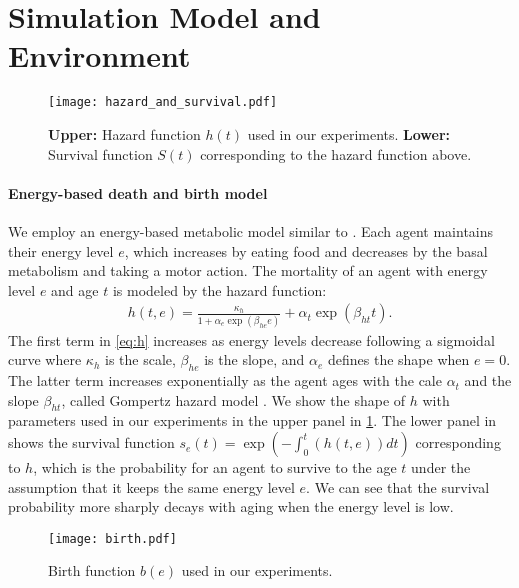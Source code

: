 \section{Simulation Model and Environment}\label{sec:method}

\begin{figure}[t]
  \centering{}
  \texttt{[image: hazard\_and\_survival.pdf]}
  \caption{
    \textbf{Upper:} Hazard function $h(t)$ used in our experiments.
    \textbf{Lower:} Survival function $S(t)$ corresponding to the hazard function above.
  }\label{figure:hs}
\end{figure}

\paragraph{Energy-based death and birth model}
We employ an energy-based metabolic model similar to \citet{hamonEcoevolutionaryDynamicsNonepisodic2023}. Each agent maintains their energy level $e$, which increases by eating food and decreases by the basal metabolism and taking a motor action.
The mortality of an agent with energy level $e$ and age $t$ is modeled by the hazard function:
\begin{align}
  h(t, e) = \frac{\kappa_{h}}{1 + \alpha_{e}\exp(\beta_{he}e)} + \alpha_{t} \exp(\beta_{ht} t).
  \label{eq:h}
\end{align}
The first term in \cref{eq:h} increases as energy levels decrease following a sigmoidal curve where $\kappa_{h}$ is the scale, $\beta_{he}$ is the slope, and $\alpha_{e}$ defines the shape when $e=0$. The latter term increases exponentially as the agent ages with the cale $\alpha_{t}$ and the slope $\beta_{ht}$, called Gompertz hazard model \citep{gompertzXXIVNatureFunction1825,kirkwoodDecipheringDeathCommentary2015}.
We show the shape of $h$ with parameters used in our experiments in the upper panel in \cref{figure:hs}. The lower panel in  shows the survival function $s_{e}(t) = \exp (-\int_{0}^{t}(h(t, e)) dt)$ corresponding to $h$, which is the probability for an agent to survive to the age $t$ under the assumption that it keeps the same energy level $e$. We can see that the survival probability more sharply decays with aging when the energy level is low.

\begin{figure}[t]
  \centering{}
  \texttt{[image: birth.pdf]}
  \caption{Birth function $b(e)$ used in our experiments.}\label{figure:birth}
\end{figure}


